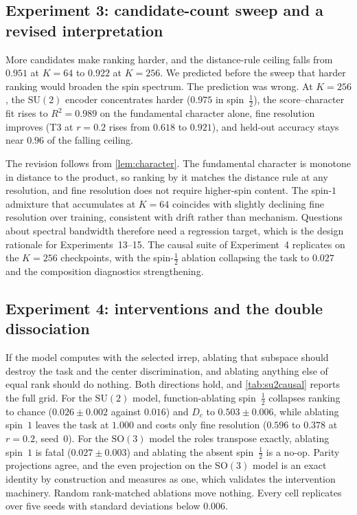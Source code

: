\documentclass{article}
\newcommand{\SU}{\mathrm{SU}}
\newcommand{\SO}{\mathrm{SO}}
\begin{document}
\subsection{Experiment 3: candidate-count sweep and a revised
interpretation}

More candidates make ranking harder, and the distance-rule ceiling falls
from $0.951$ at $K = 64$ to $0.922$ at $K = 256$. We predicted before the
sweep that harder ranking would broaden the spin spectrum. The
prediction was wrong. At $K = 256$, the $\SU(2)$ encoder concentrates
harder ($0.975$ in spin~$\tfrac12$), the score--character fit rises
to $R^2 = 0.989$ on the fundamental character alone, fine resolution improves (T3 at $r = 0.2$ rises from $0.618$ to
$0.921$), and held-out accuracy stays near $0.96$ of the falling
ceiling.

The revision follows from \cref{lem:character}. The fundamental character is monotone in distance to the product, so
ranking by it matches the distance rule at any resolution, and fine
resolution does not require higher-spin content. The spin-$1$ admixture that accumulates at
$K = 64$ coincides with slightly declining fine resolution over
training, consistent with drift rather than mechanism. Questions
about spectral bandwidth therefore need a regression target, which is
the design rationale for Experiments~13--15. The causal suite of
Experiment~4 replicates on the $K = 256$ checkpoints, with the
spin-$\tfrac12$ ablation collapsing the task to $0.027$ and the
composition diagnostics strengthening.

\subsection{Experiment 4: interventions and the double dissociation}

If the model computes with the selected irrep, ablating that
subspace should destroy the task and the center discrimination, and
ablating anything else of equal rank should do nothing. Both
directions hold, and \cref{tab:su2causal} reports the full grid. For
the $\SU(2)$ model, function-ablating spin~$\tfrac12$ collapses
ranking to chance ($0.026 \pm 0.002$ against $0.016$) and $D_c$ to
$0.503 \pm 0.006$, while ablating spin~$1$ leaves the task at
$1.000$ and costs only fine resolution ($0.596$ to $0.378$ at
$r = 0.2$, seed~0). For the $\SO(3)$ model the roles transpose
exactly, ablating spin~$1$ is fatal ($0.027 \pm 0.003$) and ablating
the absent spin~$\tfrac12$ is a no-op. Parity projections agree, and
the even projection on the $\SO(3)$ model is an exact identity by
construction and measures as one, which validates the intervention
machinery. Random rank-matched ablations move nothing. Every cell
replicates over five seeds with standard deviations below $0.006$.
\end{document}
